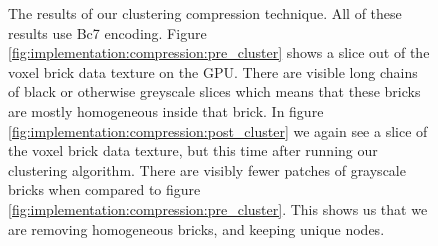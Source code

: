 \begin{figure}[H]
    \centering
    \hfill
    \caption{The results of our clustering compression technique. All of these results use Bc7 encoding. Figure \ref{fig:implementation:compression:pre_cluster} shows a slice out of the voxel brick data texture on the GPU. There are visible long chains of black or otherwise greyscale slices which means that these bricks are mostly homogeneous inside that brick. In figure \ref{fig:implementation:compression:post_cluster} we again see a slice of the voxel brick data texture, but this time after running our clustering algorithm. There are visibly fewer patches of grayscale bricks when compared to figure \ref{fig:implementation:compression:pre_cluster}. This shows us that we are removing homogeneous bricks, and keeping unique nodes.} \label{fig:implementation:compression:cluster}
\end{figure}



